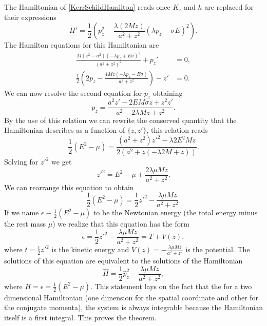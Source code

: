 \begin{Proof}
The Hamiltonian of \cref{KerrSchildHamilton} reads once $K_z$ and $h$ are replaced for their expressions
\begin{equation}\label{eq:finalH}
 H'=\frac{1}{2} \left(p_z^2-\frac{\lambda  (2 M z)}{a^2+z^2} (\lambda  p_z-\sigma E  )^2\right).
\end{equation}
The Hamilton equations for this Hamiltonian are
\begin{align}
 \frac{M \left(z^2-a^2\right) (-\lambda p_z+E \sigma )^2}{\left(a^2+z^2\right)^2}+p_z'&=0 \label{Hameje1},\\
 \frac{1}{2} \left(2 p_z-\frac{4 M z (-\lambda p_z-E \sigma )}{a^2+z^2}\right)-z'&=0 \label{Hameje2}.
\end{align}
We can now resolve the second equation for $p_z$ obtaining
\begin{equation}
p_z=\frac{a^2 z'-2 E M \sigma  z+z^2 z'}{a^2-2 \lambda  M z+z^2}.
\end{equation}
By the use of this relation we can rewrite the conserved quantity that the Hamiltonian describes as a function of $\{z,z'\}$, this relation reads
\begin{equation}
  \frac{1}{2} \left ( E^2 - \mu \right ) = \frac{\left(a^2+z^2\right) z'^2-\lambda 2 E^2 M z}{2 \left(a^2+z (-\lambda 2 M+z)\right)}.
\end{equation}
Solving for $z'^2$ we get
\begin{equation}
 z'^2= E^2 - \mu +\frac{2 \lambda  \mu  M z}{a^2+z^2}.
\end{equation}
We can rearrange this equation to obtain
\begin{equation}\label{ener}
 \frac{1}{2}(E^2-\mu)=\frac{1}{2} z'^2 -\frac{ \lambda  \mu  M z}{a^2+z^2}.
\end{equation}
If we name $\epsilon \equiv \frac{1}{2}(E^2-\mu)$ to be the Newtonian energy (the total energy minus the rest mass $\mu$) we realize that this equation has the form
\begin{equation}
 \epsilon = \frac{1}{2} z'^2 -\frac{ \lambda  \mu  M z}{a^2+z^2} = T+ V(z),
\end{equation}
where $t=\frac{1}{2} z'^2$ is the kinetic energy and $V(z)=-\frac{ \lambda  \mu  M z}{a^2+z^2}$ is the potential. The solutions of this equation are equivalent to the solutions of the Hamiltonian
\begin{equation}
 \hat{H}=\frac{1}{2} \hat{p}_z^2 -\frac{ \lambda  \mu  M z}{a^2+z^2},
\end{equation}
where $H=\epsilon =\frac{1}{2}(E^2-\mu)$. This statement lays on the fact that the for a two dimensional Hamiltonian (one dimension for the spatial coordinate and other for the conjugate momenta), the system is always integrable because the Hamiltonian itself is a first integral. This proves the theorem.\end{Proof}

